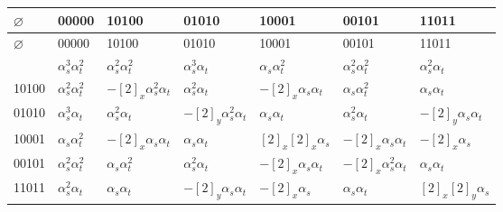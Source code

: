 \begin{longtable}{|l||p{2.1cm}|p{2.1cm}|p{2.1cm}|p{2.1cm}|p{2.1cm}|p{2.1cm}|}
\hline
$\varnothing$ & 00000 & 10100 & 01010 & 10001 & 00101 & 11011 \\ \hline
\endfirsthead
$\varnothing$ & 00000 & 10100 & 01010 & 10001 & 00101 & 11011 \\ \hline
\endhead
\endfoot
\hline
\endlastfoot
00000
& $\alpha_s^3\alpha_t^2$ %
& $\alpha_s^2\alpha_t^2$ %
& $\alpha_s^3\alpha_t$ %
& $\alpha_s\alpha_t^2$ %
& $\alpha_s^2\alpha_t^2$ %
& $\alpha_s^2\alpha_t$ %
\\
10100
& $\alpha_s^2\alpha_t^2$ %
& $-[2]_x\alpha_s^2\alpha_t$ %
& $\alpha_s^2\alpha_t$ %
& $-[2]_x\alpha_s\alpha_t$ %
& $\alpha_s\alpha_t^2$ %
& $\alpha_s\alpha_t$ %
\\
01010
& $\alpha_s^3\alpha_t$ %
& $\alpha_s^2\alpha_t$ %
& $-[2]_y\alpha_s^2\alpha_t$ %
& $\alpha_s\alpha_t$ %
& $\alpha_s^2\alpha_t$ %
& $-[2]_y\alpha_s\alpha_t$ %
\\
10001
& $\alpha_s\alpha_t^2$ %
& $-[2]_x\alpha_s\alpha_t$ %
& $\alpha_s\alpha_t$ %
& $[2]_x[2]_x\alpha_s$ %
& $-[2]_x\alpha_s\alpha_t$ %
& $-[2]_x\alpha_s$ %
\\
00101
& $\alpha_s^2\alpha_t^2$ %
& $\alpha_s\alpha_t^2$ %
& $\alpha_s^2\alpha_t$ %
& $-[2]_x\alpha_s\alpha_t$ %
& $-[2]_x\alpha_s^2\alpha_t$ %
& $\alpha_s\alpha_t$ %
\\
11011
& $\alpha_s^2\alpha_t$ %
& $\alpha_s\alpha_t$ %
& $-[2]_y\alpha_s\alpha_t$ %
& $-[2]_x\alpha_s$ %
& $\alpha_s\alpha_t$ %
& $[2]_x[2]_y\alpha_s$ %
\\
\end{longtable}


